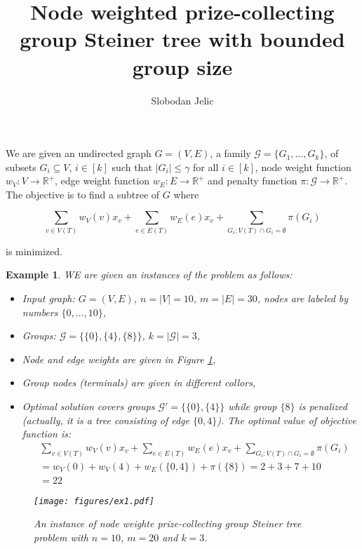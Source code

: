 \documentclass[a4paper,11pt]{article}
\title{Node weighted prize-collecting group Steiner tree with bounded group size}
\author{Slobodan Jelic}
\newtheorem{example}[section]{Example}
\begin{document}
\maketitle

We are given an undirected graph $G=\left(V,E\right)$, a family $\mathcal{G}=\{G_1,\ldots,$$G_k\}$, of subsets $G_i\subseteq V$, $i\in\left[k\right]$ such that $\left|G_i\right|\le\gamma$ for all $i\in\left[k\right]$, node weight function $w_V:V\rightarrow\mathbb{R}^+$, edge weight function $w_E:E\rightarrow\mathbb{R}^+$ and pe\-nal\-ty function $\pi:\mathcal{G}\rightarrow\mathbb{R}^+$. The objective is to find a subtree of $G$ where

$$\sum_{v\in V\left(T\right)}{w_V\left(v\right)x_v}+\sum_{e\in E\left(T\right)}{w_E\left(e\right)x_v}+\sum_{G_i:V\left(T\right)\cap G_i=\emptyset}\pi\left(G_i\right)$$

is minimized.

\begin{example} WE are given an instances of the problem as follows:
    \begin{itemize}
        \item Input graph: $G=(V,E)$, $n=|V|=10$, $m=|E|=30$, nodes are labeled by numbers $\{0,\ldots,10\}$,
        \item Groups: $\mathcal{G}=\{\{0\},\{4\},\{8\}\}$, $k=|\mathcal{G}|=3$,
        \item Node and edge weights are given in Figure \ref{fig01},
        \item Group nodes (terminals) are given in different collors,
        \item Optimal solution covers groups $\mathcal{G}'=\{\{0\},\{4\}\}$ while group $\{8\}$ is penalized (actually, it is a tree consisting of edge $\{0,4\}$). The optimal value of objective function is:
        \begin{align*}
            &\sum_{v\in V\left(T\right)}{w_V\left(v\right)x_v}+\sum_{e\in E\left(T\right)}{w_E\left(e\right)x_v}+\sum_{G_i:V\left(T\right)\cap G_i=\emptyset}\pi\left(G_i\right)\\
            &=w_V(0) + w_V(4) + w_E(\{0,4\}) + \pi(\{8\}) = 2 + 3 +7 + 10\\
            &=22
            \end{align*}
        \end{itemize}
    \begin{figure}
        \texttt{[image: figures/ex1.pdf]}
        \caption{An instance of node weighte prize-collecting group Steiner tree problem with $n=10$, $m=20$ and $k=3$.}\label{fig01}
    \end{figure}
\end{example}
\end{document}
